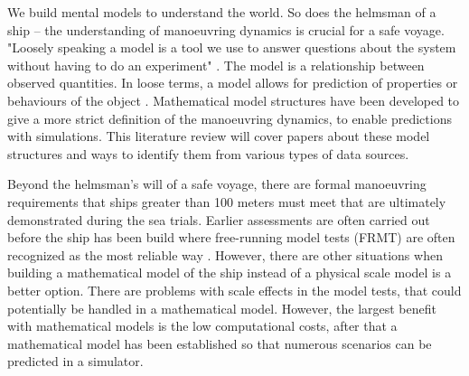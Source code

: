 We build mental models to understand the world. So does the helmsman of a ship – the understanding of manoeuvring dynamics is crucial for a safe voyage. "Loosely speaking a model is a tool we use to answer questions about the system without having to do an experiment" \cite{ljungModelingIdentificationDynamic2021}. The model is a relationship between observed quantities. In loose terms, a model allows for prediction of properties or behaviours of the object \cite{ljungPerspectivesSystemIdentification2010}.
Mathematical model structures have been developed to give a more strict definition of the manoeuvring dynamics, to enable predictions with simulations. This literature review will cover papers about these model structures and ways to identify them from various types of data sources.

Beyond the helmsman's will of a safe voyage, there are formal manoeuvring requirements that ships greater than 100 meters must meet  \cite{imoStandardsShipManoeuvrability2002} that are ultimately demonstrated during the sea trials. Earlier assessments are often carried out before the ship has been build where free-running model tests (FRMT) are often recognized as the most reliable way \cite{ittcManeuveringCommitteeITTC2008}. However, there are other situations when building a mathematical model of the ship instead of a physical scale model is a better option.  There are problems with scale effects in the model tests, that could potentially be handled in a mathematical model.  However, the largest benefit with mathematical models is the low  computational costs, after that a mathematical model has been established so that numerous scenarios can be predicted in a simulator.

